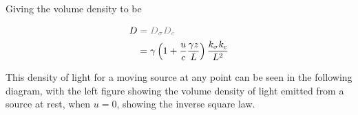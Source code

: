 Giving the volume density to be

\begin{equation}
	\begin{aligned}
		D & \color{gray} = D_{\sigma} D_{c}                                                         \\
		  & = {\gamma}\left(1 + \dfrac{u}{c}\dfrac{\gamma z}{L}\right) \frac{k_{\sigma} k_{c}}{L^2}
	\end{aligned}
\end{equation}

This density of light for a moving source at any point can be seen in the following diagram, with the left figure showing the volume density of light emitted from a source at rest, when $u=0$, showing the inverse square law.



